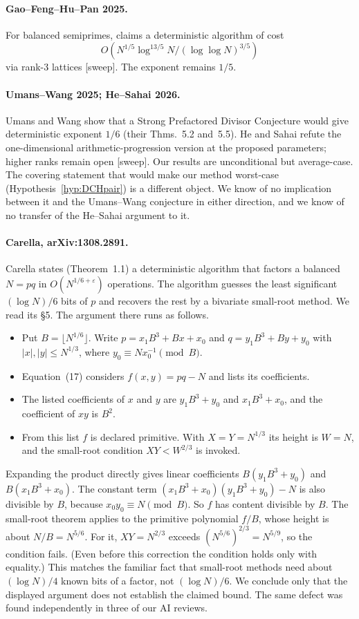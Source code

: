 \documentclass[11pt]{amsart}
\theoremstyle{definition}
\begin{document}
\paragraph{Gao--Feng--Hu--Pan 2025.}
For balanced semiprimes, \cite{gao2025} claims a deterministic algorithm of cost
\[O(N^{1/5}\log^{13/5}N/(\log\log N)^{3/5})\]
via rank-3 lattices [sweep]. The exponent
remains $1/5$.

\paragraph{Umans--Wang 2025; He--Sahai 2026.}
Umans and Wang \cite{umanswang2025} show that a Strong Prefactored Divisor Conjecture would
give deterministic exponent $1/6$ (their Thms.~5.2 and~5.5). He and Sahai \cite{hesahai2026}
refute the one-dimensional arithmetic-progression version at the proposed parameters; higher
ranks remain open [sweep]. Our results are unconditional but average-case. The covering
statement that would make our method worst-case (Hypothesis~\ref{hyp:DCHpair}) is a different
object. We know of no implication between it and the Umans--Wang conjecture in either
direction, and we know of no transfer of the He--Sahai argument to it.

\paragraph{Carella, arXiv:1308.2891.}
Carella \cite{carella} states (Theorem~1.1) a deterministic algorithm that factors a balanced
$N=pq$ in $O(N^{1/6+\varepsilon})$ operations. The algorithm guesses the least significant
$(\log N)/6$ bits of $p$ and recovers the rest by a bivariate small-root method. We read its \S5.
The argument there runs as follows.
\begin{itemize}
\item Put $B=\lfloor N^{1/6}\rfloor$. Write $p=x_1B^3+Bx+x_0$ and $q=y_1B^3+By+y_0$ with
  $|x|,|y|\le N^{1/3}$, where $y_0\equiv Nx_0^{-1}\pmod B$.
\item Equation~(17) considers $f(x,y)=pq-N$ and lists its coefficients.
\item The listed coefficients of $x$ and $y$ are $y_1B^3+y_0$ and $x_1B^3+x_0$, and the
  coefficient of $xy$ is $B^2$.
\item From this list $f$ is declared primitive. With $X=Y=N^{1/3}$ its height is $W=N$, and the
  small-root condition $XY<W^{2/3}$ is invoked.
\end{itemize}
Expanding the product directly gives linear coefficients $B(y_1B^3+y_0)$ and $B(x_1B^3+x_0)$.
The constant term $(x_1B^3+x_0)(y_1B^3+y_0)-N$ is also divisible by $B$, because
$x_0y_0\equiv N\pmod B$. So $f$ has content divisible by $B$. The small-root theorem applies to
the primitive polynomial $f/B$, whose height is about $N/B=N^{5/6}$. For it, $XY=N^{2/3}$ exceeds
$(N^{5/6})^{2/3}=N^{5/9}$, so the condition fails. (Even before this correction the condition
holds only with equality.) This matches the familiar fact that small-root methods need about
$(\log N)/4$ known bits of a factor, not $(\log N)/6$. We conclude only that the displayed
argument does not establish the claimed bound. The same defect was found independently in three
of our AI reviews.
\end{document}
